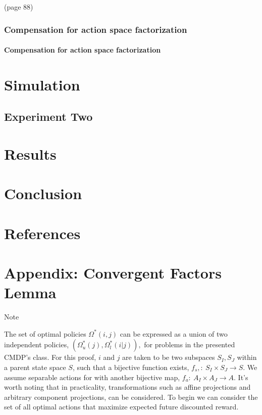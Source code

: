 \documentclass[compsoc,journal,letterpaper,10pt,draftcls,twocolumn]{IEEEtran}
\begin{document}
(page 88)

\subsubsection{Compensation for action space
factorization}\label{compensation-for-action-space-factorization}

\paragraph{Compensation for action space
factorization}\label{compensation-for-action-space-factorization-1}

\section{}\label{section-1}

\section{Simulation}\label{simulation-1}

\subsection{Experiment Two}\label{experiment-two}

\section{Results}\label{results}

\section{Conclusion}\label{conclusion}

\section{References}\label{references}

\section{Appendix: Convergent Factors
Lemma}\label{appendix-convergent-factors-lemma}

Note

The set of optimal policies \(\Omega_{\ }^{*}\left( i,j \right)\) can be
expressed as a union of two independent policies,
\(\left( \Omega_{u}^{*}\left( j \right),\Omega_{l}^{*}\left( i|j \right) \right),\)
for problems in the presented CMDP's class. For this proof, \(i\) and
\(j\) are taken to be two subspaces \(S_{I},S_{J}\) within a parent
state space \(S\), such that a bijective function exists,
\(f_{s},:\ S_{I} \times S_{J} \rightarrow S.\) We assume separable
actions for with another bijective map,
\(f_{a}:\ A_{I} \times A_{J} \rightarrow A\). It's worth noting that in
practicality, transformations such as affine projections and arbitrary
component projections, can be considered. To begin we can consider the
set of all optimal actions that maximize expected future discounted
reward.
\end{document}
